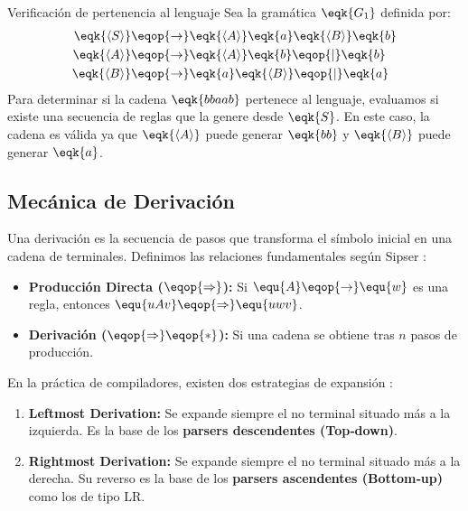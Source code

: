 \begin{ejemplo}{Verificación de pertenencia al lenguaje}
Sea la gramática $\eqk{G_1}$ definida por:
\begin{align*}
\eqk{\langle S \rangle} &\eqop{\rightarrow} \eqk{\langle A \rangle} \eqk{a} \eqk{\langle B \rangle} \eqk{b} \\
\eqk{\langle A \rangle} &\eqop{\rightarrow} \eqk{\langle A \rangle} \eqk{b} \eqop{\mid} \eqk{b} \\
\eqk{\langle B \rangle} &\eqop{\rightarrow} \eqk{a} \eqk{\langle B \rangle} \eqop{\mid} \eqk{a}
\end{align*}
Para determinar si la cadena $\eqk{bbaab}$ pertenece al lenguaje, evaluamos si existe una secuencia de reglas que la genere desde $\eqk{S}$. En este caso, la cadena es válida ya que $\eqk{\langle A \rangle}$ puede generar $\eqk{bb}$ y $\eqk{\langle B \rangle}$ puede generar $\eqk{a}$.
\end{ejemplo}

\subsection{Mecánica de Derivación}

Una derivación es la secuencia de pasos que transforma el símbolo inicial en una cadena de terminales. Definimos las relaciones fundamentales según Sipser \cite{sipser2012introduction}:

\begin{itemize}
    \item \textbf{Producción Directa ($\eqop{\Rightarrow}$):} Si $\equ{A} \eqop{\rightarrow} \equ{w}$ es una regla, entonces $\equ{uAv} \eqop{\Rightarrow} \equ{uwv}$.
    \item \textbf{Derivación ($\eqop{\Rightarrow}\eqop{*}$):} Si una cadena se obtiene tras $n$ pasos de producción.
\end{itemize}

En la práctica de compiladores, existen dos estrategias de expansión \cite{aho2006compilers}:
\begin{enumerate}
    \item \textbf{Leftmost Derivation:} Se expande siempre el no terminal situado más a la izquierda. Es la base de los \textbf{parsers descendentes (Top‑down)}.
    \item \textbf{Rightmost Derivation:} Se expande siempre el no terminal situado más a la derecha. Su reverso es la base de los \textbf{parsers ascendentes (Bottom‑up)} como los de tipo LR.
\end{enumerate}

